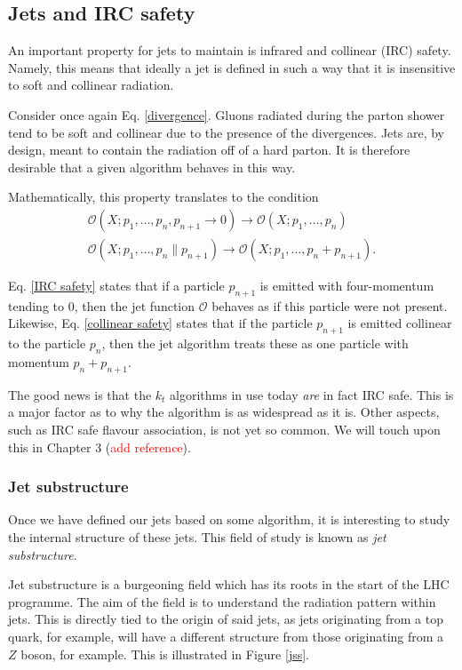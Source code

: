 \documentclass[10pt,a4paper]{book}
\begin{document}
\subsection{Jets and IRC safety}
An important property for jets to maintain is infrared and collinear (IRC) safety. Namely, this means that ideally a jet is defined in such a way that 
it is insensitive to soft and collinear radiation.

Consider once again Eq. \ref{divergence}. Gluons radiated during the parton shower tend to be soft and collinear due to the presence of the divergences. Jets are, by design, meant to contain the radiation off of a hard parton. It is therefore desirable that a given algorithm behaves in this way.

Mathematically, this property translates to the condition
\begin{gather}
\mathcal{O}(X; p_1, \dots, p_n, p_{n+1} \rightarrow 0) \rightarrow  \mathcal{O}(X; p_1, \dots, p_n ) \label{IRC safety}\\
\mathcal{O}(X; p_1, \dots, p_n \parallel p_{n+1}) \rightarrow \mathcal{O}(X; p_1, \dots, p_n+p_{n+1}).
\label{collinear safety}
\end{gather}

Eq. \ref{IRC safety} states that if a particle $p_{n+1}$ is emitted with four-momentum tending to 0, then the jet function $\mathcal{O}$ behaves as if this particle were not present. Likewise, Eq. \ref{collinear safety} states that if the particle $p_{n+1}$ is emitted collinear to the particle $p_n$, then the jet algorithm treats these as one particle with momentum $p_n+p_{n+1}$. 

The good news is that the $k_t$ algorithms in use today \emph{are} in fact IRC safe. This is a major factor as to why the algorithm is as widespread as it is. Other aspects, such as IRC safe flavour association, is not yet so common. We will touch upon this in Chapter 3 (\textcolor{red}{add reference}).

\subsubsection{Jet substructure}
Once we have defined our jets based on some algorithm, it is interesting to study the internal structure of these jets. This field of study is known as \emph{jet substructure}.

Jet substructure is a burgeoning field which has its roots in the start of the LHC programme. The aim of the field is to understand the radiation pattern within jets. This is directly tied to the origin of said jets, as jets originating from a top quark, for example, will have a different structure from those originating from a $Z$ boson, for example. This is illustrated in Figure \ref{jss}.
\end{document}
